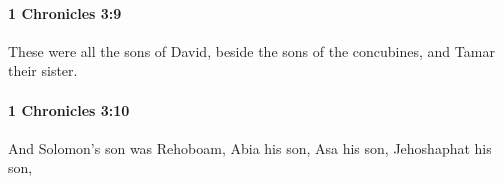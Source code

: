 		\paragraph{1 Chronicles 3:9} %
			\label{1CHRONICLES-3-9}

			These were all the sons of David, beside the sons of the concubines, and Tamar their sister.


		\paragraph{1 Chronicles 3:10} %
			\label{1CHRONICLES-3-10}

			And Solomon’s son was Rehoboam, Abia his son, Asa his son, Jehoshaphat his son,


